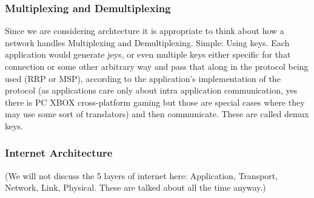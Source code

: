 \documentclass[11pt, a4paper]{article}
\begin{document}
\subsubsection{Multiplexing and Demultiplexing}
Since we are considering archtecture it is appropriate to think about how a network handles Multiplexing and Demultiplexing. Simple: Using keys. Each application would generate jeys, or even multiple keys either specific for that connection or some other arbitrary way and pass that along in the protocol being used (RRP or MSP), according to the application's implementation of the protocol (as applications care only about intra application communication, yes there is PC XBOX cross-platform gaming but those are special cases where they may use some sort of translators) and then communicate. These are called demux keys.

\subsubsection{Internet Architecture}

(We will not discuss the 5 layers of internet here:
Application, Transport, Network, Link, Physical. These are talked about all the time anyway.)
\end{document}
